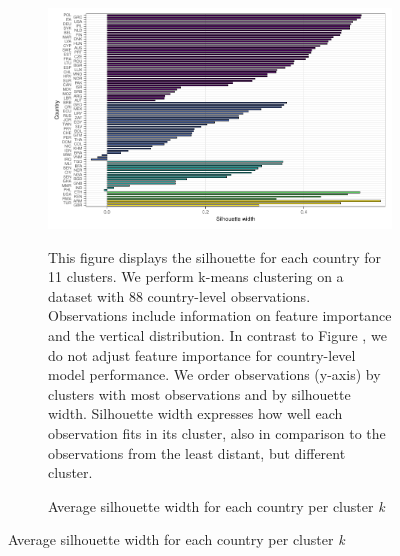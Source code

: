  \begin{figure}[ht!]\ContinuedFloat
   \centering
   \begin{subfigure}[b]{\textwidth}
   \centering
   \includegraphics{Figures_Appendix/Figure_Silhouette_Clusters_1.pdf}
   \caption{Average silhouette width for each country per cluster \textit{k}} \label{fig:G2_silhouette}
   \begin{subcaption2}
     This figure displays the silhouette for each country for 11 clusters. We perform k-means clustering on a dataset with 88 country-level observations. Observations include information on feature importance and the vertical distribution. In contrast to Figure , we do not adjust feature importance for country-level model performance. We order observations (y-axis) by clusters with most observations and by silhouette width. Silhouette width expresses how well each observation fits in its cluster, also in comparison to the observations from the least distant, but different cluster.
   \end{subcaption2}
   \end{subfigure}
 \end{figure}
 \clearpage


